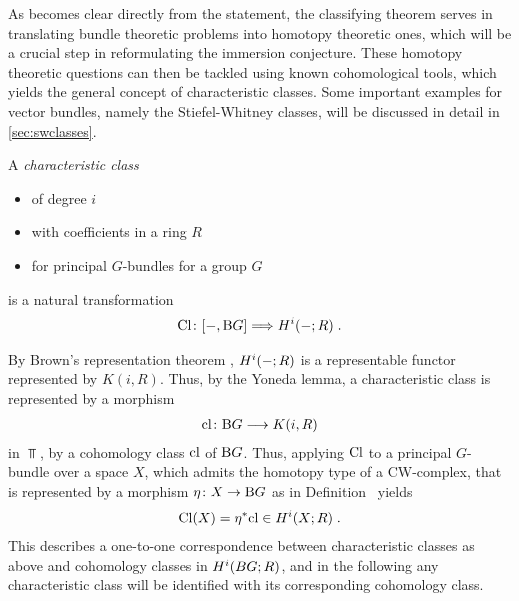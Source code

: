 As becomes clear directly from the statement, the classifying
theorem serves in translating bundle theoretic problems into homotopy
theoretic ones, which will be a crucial step in reformulating the
immersion conjecture.
These homotopy theoretic questions can then be tackled using known
cohomological tools, which yields the general concept of
characteristic classes.
Some important examples for vector bundles, namely the
Stiefel-Whitney classes, will be discussed in detail in
\autoref{sec:swclasses}.
\begin{Def}
  A \emph{characteristic class}
  \begin{itemize}
  \item of degree $i$
  \item with coefficients in a ring $R$
  \item for principal $G$-bundles for a group $G$
  \end{itemize}
  is a natural transformation
  \begin{gather*}
    \mathrm{Cl}\colon [-, \mathrm{B}G] \Longrightarrow H^i(-; R)\;.
  \end{gather*}
\end{Def}
\begin{Rem}
  By Brown's representation theorem ,
  $H^i(-;R)$ is a representable functor represented by $K(i,R)$.
  Thus, by the Yoneda lemma, a characteristic class is
  represented by a morphism
  \begin{gather*}
    \mathrm{cl}\colon \mathrm{B}G \longrightarrow K(i, R)
  \end{gather*}
  in $\Top$, \idest by a cohomology class $\mathrm{cl}$ of $\mathrm{B}G$.
  Thus, applying $\mathrm{Cl}$ to a principal $G$-bundle over a
  space $X$, which admits the homotopy type of a CW-complex, that is
  represented by a morphism $\eta\colon X\to\mathrm{B}G$
  as in Definition~
  yields
  \begin{gather*}
    \mathrm{Cl}(X) = {\eta}^* \mathrm{cl} \in H^i(X;R)
    \;.
  \end{gather*}
  This describes a one-to-one correspondence between
  characteristic classes as above and cohomology classes in
  $H^i(BG;R)$, and in the following any characteristic class will be
  identified with its corresponding cohomology class.
\end{Rem}

